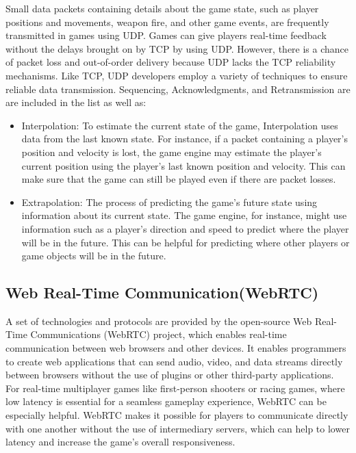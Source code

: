 Small data packets containing details about the game state, such as player positions and movements, weapon fire, and other game events, are frequently transmitted in games using UDP. Games can give players real-time feedback without the delays brought on by TCP by using UDP. However, there is a chance of packet loss and out-of-order delivery because UDP lacks the TCP reliability mechanisms.\cite{glazer2015multiplayer}
Like TCP, UDP developers employ a variety of techniques to ensure reliable data transmission. Sequencing, Acknowledgments, and Retransmission are are included in the list as well as:
\begin{itemize}
    \item Interpolation: To estimate the current state of the game, Interpolation uses data from the last known state. For instance, if a packet containing a player's position and velocity is lost, the game engine may estimate the player's current position using the player's last known position and velocity. This can make sure that the game can still be played even if there are packet losses.\cite{realtimecollision}
    \item Extrapolation: The process of predicting the game's future state using information about its current state. The game engine, for instance, might use information such as a player's direction and speed to predict where the player will be in the future. This can be helpful for predicting where other players or game objects will be in the future.\cite{realtimecollision}
\end{itemize}

\subsection{Web Real-Time Communication(WebRTC)}
A set of technologies and protocols are provided by the open-source Web Real-Time Communications (WebRTC) project, which enables real-time communication between web browsers and other devices. It enables programmers to create web applications that can send audio, video, and data streams directly between browsers without the use of plugins or other third-party applications.\cite{webrtc}
For real-time multiplayer games like first-person shooters or racing games, where low latency is essential for a seamless gameplay experience, WebRTC can be especially helpful. WebRTC makes it possible for players to communicate directly with one another without the use of intermediary servers, which can help to lower latency and increase the game's overall responsiveness.\cite{webrtcrealtimegaming}

